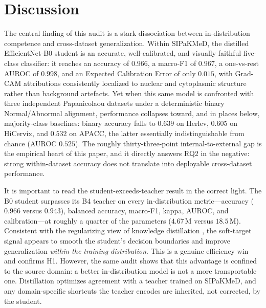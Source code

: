\documentclass[twocolumn]{article}
\begin{document}
\section{Discussion}

The central finding of this audit is a stark dissociation between in-distribution competence and cross-dataset generalization. Within SIPaKMeD, the distilled EfficientNet-B0 student is an accurate, well-calibrated, and visually faithful five-class classifier: it reaches an accuracy of $0.966$, a macro-F1 of $0.967$, a one-vs-rest AUROC of $0.998$, and an Expected Calibration Error of only $0.015$, with Grad-CAM attributions consistently localized to nuclear and cytoplasmic structure rather than background artefacts. Yet when this same model is confronted with three independent Papanicolaou datasets under a deterministic binary Normal/Abnormal alignment, performance collapses toward, and in places below, majority-class baselines: binary accuracy falls to $0.639$ on Herlev, $0.605$ on HiCervix, and $0.532$ on APACC, the latter essentially indistinguishable from chance (AUROC $0.525$). The roughly thirty-three-point internal-to-external gap is the empirical heart of this paper, and it directly answers RQ2 in the negative: strong within-dataset accuracy does not translate into deployable cross-dataset performance.

It is important to read the student-exceeds-teacher result in the correct light. The B0 student surpasses its B4 teacher on every in-distribution metric---accuracy ($0.966$ versus $0.943$), balanced accuracy, macro-F1, kappa, AUROC, and calibration---at roughly a quarter of the parameters ($4.67$\,M versus $18.5$\,M). Consistent with the regularizing view of knowledge distillation \citep{hinton2015distilling}, the soft-target signal appears to smooth the student's decision boundaries and improve generalization \emph{within the training distribution}. This is a genuine efficiency win and confirms H1. However, the same audit shows that this advantage is confined to the source domain: a better in-distribution model is not a more transportable one. Distillation optimizes agreement with a teacher trained on SIPaKMeD, and any domain-specific shortcuts \citep{geirhos2020shortcut} the teacher encodes are inherited, not corrected, by the student.
\end{document}
